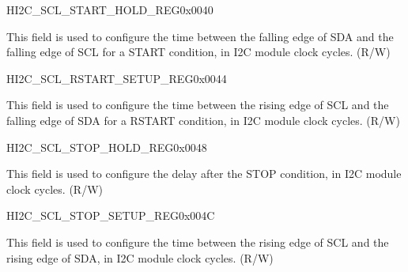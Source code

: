 \begin{register}{H}{I2C\_SCL\_START\_HOLD\_REG}{0x0040}\label{regdesc:I2CSCLSTARTHOLDREG}
%
%
\regnewline%
\begin{regdesc}\begin{reglist}
\label{fielddesc:I2CSCLSTARTHOLDTIME}\item [I2C\_SCL\_START\_HOLD\_TIME] This field is used to configure the time between the falling edge
of SDA and the falling edge of SCL for a START condition, in I2C module clock cycles. (R/W)
\end{reglist}\end{regdesc}
\end{register}


\begin{register}{H}{I2C\_SCL\_RSTART\_SETUP\_REG}{0x0044}\label{regdesc:I2CSCLRSTARTSETUPREG}
%
%
\regnewline%
\begin{regdesc}\begin{reglist}
\label{fielddesc:I2CSCLRSTARTSETUPTIME}\item [I2C\_SCL\_RSTART\_SETUP\_TIME] This field is used to configure the time between the rising
edge of SCL and the falling edge of SDA for a RSTART condition, in I2C module clock cycles. (R/W)
\end{reglist}\end{regdesc}
\end{register}


\begin{register}{H}{I2C\_SCL\_STOP\_HOLD\_REG}{0x0048}\label{regdesc:I2CSCLSTOPHOLDREG}
%
%
\regnewline%
\begin{regdesc}\begin{reglist}
\label{fielddesc:I2CSCLSTOPHOLDTIME}\item [I2C\_SCL\_STOP\_HOLD\_TIME] This field is used to configure the delay after the STOP condition,
in I2C module clock cycles. (R/W)
\end{reglist}\end{regdesc}
\end{register}


\begin{register}{H}{I2C\_SCL\_STOP\_SETUP\_REG}{0x004C}\label{regdesc:I2CSCLSTOPSETUPREG}
%
%
\regnewline%
\begin{regdesc}\begin{reglist}
\label{fielddesc:I2CSCLSTOPSETUPTIME}\item [I2C\_SCL\_STOP\_SETUP\_TIME] This field is used to configure the time between the rising edge
of SCL and the rising edge of SDA, in I2C module clock cycles. (R/W)
\end{reglist}\end{regdesc}
\end{register}



